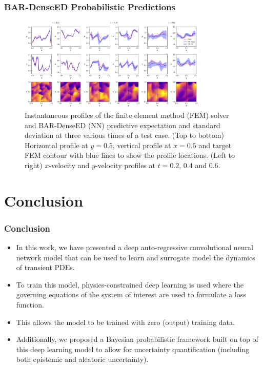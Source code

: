 \documentclass{beamer}
\theoremstyle{remark}
\begin{document}
\begin{frame}
\frametitle{BAR-DenseED Probabilistic Predictions}
\begin{figure}[H]
    \centering
    \includegraphics[width=0.8\textwidth]{Fig25.png}
    \caption{Instantaneous profiles of the finite element method (FEM) solver and BAR-DenseED (NN) predictive expectation and standard deviation at three various times of a test case.
    (Top to bottom) Horizontal profile at $y=0.5$, vertical profile at $x=0.5$ and target FEM contour with blue lines to show the profile locations.
    (Left to right) $x$-velocity and $y$-velocity profiles at $t=0.2$, $0.4$ and $0.6$.}
    \label{fig:burgers2D-profiles}
\end{figure}
\end{frame}

\section{Conclusion}

\begin{frame}
\frametitle{Conclusion}
\begin{itemize}
\item{In this work, we have presented a deep auto-regressive convolutional neural network model that can be used to learn and surrogate model the dynamics of transient PDEs.
}
\item{To train this model, physics-constrained deep learning is used where the governing equations of the system of interest are used to formulate a loss function.}
\item{This allows the model to be trained with zero (output) training data.}

\item{Additionally, we proposed a Bayesian probabilistic framework built on top of this deep learning model to allow for uncertainty quantification (including both epistemic and aleatoric uncertainty).}

\end{itemize}
\end{frame}
\end{document}

